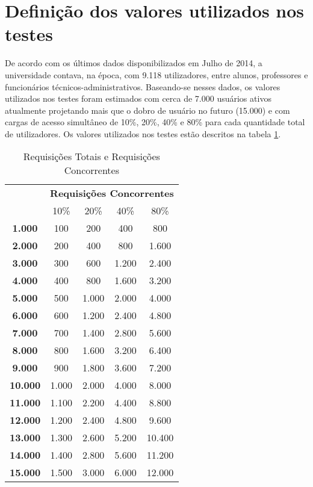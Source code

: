 

\section{Definição dos valores utilizados nos testes}

De acordo com os últimos dados disponibilizados em Julho de 2014, a 
universidade contava, na época, com 9.118 utilizadores, entre alunos, 
professores e funcionários técnicos-administrativos. Baseando-se nesses dados, 
os valores utilizados nos testes foram estimados com cerca de 7.000 usuários 
ativos atualmente projetando mais que o dobro de usuário no futuro (15.000) e 
com cargas de acesso simultâneo de 10\%, 20\%, 40\% e 80\% para cada quantidade 
total de utilizadores. Os valores utilizados nos testes estão descritos na 
tabela \ref{tab:requisicoes}.

\begin{table}[htb]
	\centering
	\ABNTEXfontereduzida
	\caption[Requisições Totais e Requisições Concorrentes]{Requisições Totais 
	e Requisições Concorrentes}
	\label{tab:requisicoes}
		\begin{tabular}{|>{\bfseries}c|c|c|c|c|}
		\hline
		\multirow{2}{*}{Requisições Totais} & 
		\multicolumn{4}{c|}{\textbf{Requisições 
		Concorrentes}} \\ \cline{2-5}
		& 10\%      & 20\%  & 40\%  & 80\%  \\ \hline
		1.000  & 100   & 200   & 400   & 800   \\ \hline
		2.000  & 200   & 400   & 800   & 1.600  \\ \hline
		3.000  & 300   & 600   & 1.200 & 2.400  \\ \hline
		4.000  & 400   & 800   & 1.600 & 3.200  \\ \hline
		5.000  & 500   & 1.000 & 2.000 & 4.000  \\ \hline
		6.000  & 600   & 1.200 & 2.400 & 4.800  \\ \hline
		7.000  & 700   & 1.400 & 2.800 & 5.600  \\ \hline
		8.000  & 800   & 1.600 & 3.200 & 6.400  \\ \hline
		9.000  & 900   & 1.800 & 3.600 & 7.200  \\ \hline
		10.000 & 1.000 & 2.000 & 4.000 & 8.000  \\ \hline
		11.000 & 1.100 & 2.200 & 4.400 & 8.800  \\ \hline
		12.000 & 1.200 & 2.400 & 4.800 & 9.600  \\ \hline
		13.000 & 1.300 & 2.600 & 5.200 & 10.400 \\ \hline
		14.000 & 1.400 & 2.800 & 5.600 & 11.200 \\ \hline
		15.000 & 1.500 & 3.000 & 6.000 & 12.000 \\ \hline
		\end{tabular}
\end{table}

